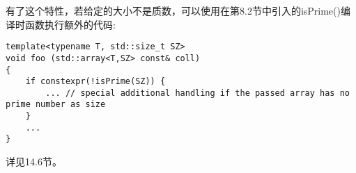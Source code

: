 有了这个特性，若给定的大小不是质数，可以使用在第8.2节中引入的isPrime()编译时函数执行额外的代码:

\begin{lstlisting}[style=styleCXX]
template<typename T, std::size_t SZ>
void foo (std::array<T,SZ> const& coll)
{
	if constexpr(!isPrime(SZ)) {
		... // special additional handling if the passed array has no prime number as size
	}
	...
}
\end{lstlisting}

详见14.6节。



























